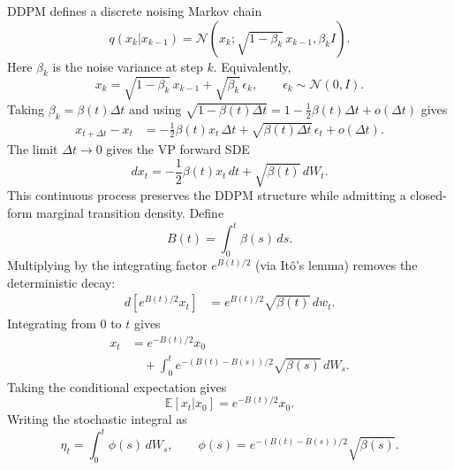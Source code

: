 \documentclass[reprint,amsmath,amssymb,aps,pra,10pt]{revtex4-2}
\begin{document}
DDPM defines a discrete noising Markov chain \cite{sohldickstein2015,ho2020}
\begin{equation}
    q(x_k|x_{k-1})
    =
    \mathcal{N}
    \left(
        x_k;
        \sqrt{1-\beta_k}\,x_{k-1},
        \beta_k I
    \right).
\end{equation}
Here $\beta_k$ is the noise variance at step $k$.
Equivalently,
\begin{equation}
    x_k
    =
    \sqrt{1-\beta_k}\,x_{k-1}
    +
    \sqrt{\beta_k}\,\epsilon_k,
    \qquad
    \epsilon_k\sim\mathcal{N}(0,I).
\end{equation}
Taking $\beta_k=\beta(t)\Delta t$ and using $\sqrt{1-\beta(t)\Delta t}=1-\frac{1}{2}\beta(t)\Delta t+o(\Delta t)$ gives
\begin{align}
    x_{t+\Delta t}-x_t
    &=
    -\frac{1}{2}\beta(t)x_t\,\Delta t
    +
    \sqrt{\beta(t)\Delta t}\,\epsilon_t
    +
    o(\Delta t).
\end{align}
The limit $\Delta t\to 0$ gives the VP forward SDE
\begin{equation}
    dx_t
    =
    -\frac{1}{2}\beta(t)x_t\,dt
    +
    \sqrt{\beta(t)}\,dW_t.
\end{equation}
This continuous process preserves the DDPM structure while admitting a closed-form marginal transition density.
Define
\begin{equation}
    B(t)
    =
    \int_0^t
    \beta(s)\,ds.
\end{equation}
Multiplying by the integrating factor $e^{B(t)/2}$ (via It\^o's lemma) removes the deterministic decay:
\begin{align}
    d
    \left[
        e^{B(t)/2}x_t
    \right]
    &=
    e^{B(t)/2}
    \sqrt{\beta(t)}
    \,dw_t.
\end{align}
Integrating from $0$ to $t$ gives
\begin{equation}
    \begin{aligned}
        x_t
        &=
        e^{-B(t)/2}x_0
        \\
        &\quad
        +
        \int_0^t
        e^{-(B(t)-B(s))/2}
        \sqrt{\beta(s)}
        \,dW_s.
    \end{aligned}
\end{equation}
Taking the conditional expectation gives
\begin{equation}
    \mathbb{E}[x_t|x_0]
    =
    e^{-B(t)/2}x_0.
\end{equation}
Writing the stochastic integral as
\begin{equation}
    \eta_t
    =
    \int_0^t
    \phi(s)\,dW_s,
    \qquad
    \phi(s)
    =
    e^{-(B(t)-B(s))/2}
    \sqrt{\beta(s)}.
\end{equation}
\end{document}
